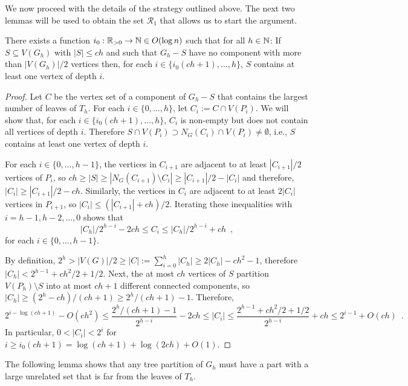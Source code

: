 \documentclass{patmorin}
\renewcommand{\le}{\leqslant}
\renewcommand{\ge}{\geqslant}
\begin{document}
We now proceed with the details of the strategy outlined above.  The next two lemmas will be used to obtain the set $\mathcal{R}_1$ that allows us to start the argument.

\begin{lem}\label{small_depth_separator}
  There exists a function $i_0:\mathbb{R}_{>0}\to\mathbb{N}\in O(\log n)$ such that for all $h\in\mathbb{N}$: If $S\subseteq V(G_h)$ with $|S|\le ch$ and such that $G_h-S$ have no component with more than $|V(G_h)|/2$ vertices then, for each $i\in\{i_0(ch+1),\ldots,h\}$, $S$ contains at least one vertex of depth $i$.
\end{lem}

\begin{proof}
  Let $C$ be the vertex set of a component of $G_h-S$ that contains the largest number of leaves of $T_h$.  For each $i\in\{0,\ldots,h\}$, let $C_i:=C\cap V(P_i)$. We will show that, for each $i\in\{i_0(ch+1),\ldots,h\}$, $C_i$ is non-empty but does not contain all vertices of depth $i$.  Therefore $S\cap V(P_i)\supset N_G(C_i)\cap V(P_i)\neq\emptyset$, i.e., $S$ contains at least one vertex of depth $i$.
  
  For each $i\in\{0,\ldots,h-1\}$, the vertices in $C_{i+1}$ are adjacent to at least $|C_{i+1}|/2$ vertices of $P_{i}$, so $ch \ge |S| \ge |N_G(C_{i+1})\setminus C_{i}| \ge |C_{i+1}|/2 - |C_{i}|$ and therefore, $|C_{i}| \ge |C_{i+1}|/2 - ch$.  Similarly, the vertices in $C_i$ are adjacent to at least $2|C_i|$ vertices in $P_{i+1}$, so $|C_i|\le (|C_{i+1}| + ch)/2$.  Iterating these inequalities with $i=h-1,h-2,\ldots,0$ shows that 
  \[  
    |C_h|/2^{h-i} - 2ch \le C_{i} \le |C_h|/2^{h-i} + ch   \enspace ,
  \]  
  for each $i\in\{0,\ldots,h-1\}$.

  By definition, $2^h >|V(G)|/2 \ge |C| := \sum_{i=0}^h |C_h| \ge 2|C_h|-ch^2-1$, therefore $|C_h| < 2^{h-1} + ch^2/2 + 1/2$.  Next, the at most $ch$ vertices of $S$ partition $V(P_h)\setminus S$ into at most $ch+1$ different connected components, so $|C_h| \ge (2^h-ch)/(ch+1) \ge 2^{h}/(ch+1) - 1$.  Therefore,
  \[ 
      2^{i-\log(ch+1)} - O(ch^2) \le \frac{2^h/(ch+1)-1}{2^{h-i}} - 2ch \le |C_i| 
      \le \frac{2^{h-1}+ch^2/2 + 1/2}{2^{h-i}} + ch \le 2^{i-1} + O(ch)
      \enspace .
  \]
  In particular, $0 < |C_i| < 2^i$ for $i\ge i_0(ch+1)= \log (ch+1) + \log(2ch)+O(1)$.
\end{proof}


The following lemma shows that any tree partition of $G_h$ must have a part with a large unrelated set that is far from the leaves of $T_h$.
\end{document}
